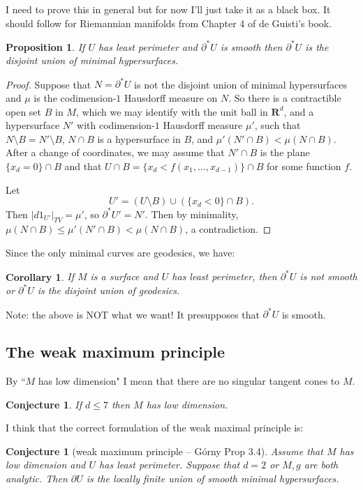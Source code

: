 \documentclass[reqno,12pt,letterpaper]{amsart}
\newcommand{\RR}{\mathbf{R}}
\newtheorem{proposition}[theorem]{Proposition}
\newtheorem{corollary}[theorem]{Corollary}
\newtheorem{conjecture}[theorem]{Conjecture}
\theoremstyle{definition}
\numberwithin{equation}{section}
\begin{document}
I need to prove this in general but for now I'll just take it as a black box.
It should follow for Riemannian manifolds from Chapter 4 of de Guisti's book.

\begin{proposition}
If $U$ has least perimeter and $\partial^* U$ is smooth then $\partial^* U$ is the disjoint union of minimal hypersurfaces.
\end{proposition}
\begin{proof}
Suppose that $N = \partial^* U$ is not the disjoint union of minimal hypersurfaces and $\mu$ is the codimension-$1$ Hausdorff measure on $N$.
So there is a contractible open set $B$ in $M$, which we may identify with the unit ball in $\RR^d$, and a hypersurface $N'$ with codimension-$1$ Hausdorff measure $\mu'$, such that $N \setminus B = N' \setminus B$, $N \cap B$ is a hypersurface in $B$, and $\mu'(N' \cap B) < \mu(N \cap B)$.
After a change of coordinates, we may assume that $N' \cap B$ is the plane $\{x_d = 0\} \cap B$ and that $U \cap B = \{x_d < f(x_1, \dots, x_{d-1})\} \cap B$ for some function $f$.

Let
$$U' = (U \setminus B) \cup (\{x_d < 0\} \cap B).$$
Then $|d1_{U'}|_{TV} = \mu'$, so $\partial^* U' = N'$.
Then by minimality, $\mu(N \cap B) \leq \mu'(N' \cap B) < \mu(N \cap B)$, a contradiction.
\end{proof}

Since the only minimal curves are geodesics, we have:

\begin{corollary}
If $M$ is a surface and $U$ has least perimeter, then $\partial^* U$ is not smooth or $\partial^* U$ is the disjoint union of geodesics.
\end{corollary}

Note: the above is NOT what we want! It presupposes that $\partial^* U$ is smooth.

\subsection{The weak maximum principle}
By ``$M$ has low dimension" I mean that there are no singular tangent cones to $M$.

\begin{conjecture}
If $d \leq 7$ then $M$ has low dimension.
\end{conjecture}

I think that the correct formulation of the weak maximal principle is:

\begin{conjecture}[weak maximum principle -- G\'orny Prop 3.4]
Assume that $M$ has low dimension and $U$ has least perimeter.
Suppose that $d = 2$ or $M,g$ are both analytic.
Then $\partial U$ is the locally finite union of smooth minimal hypersurfaces.
\end{conjecture}
\end{document}
